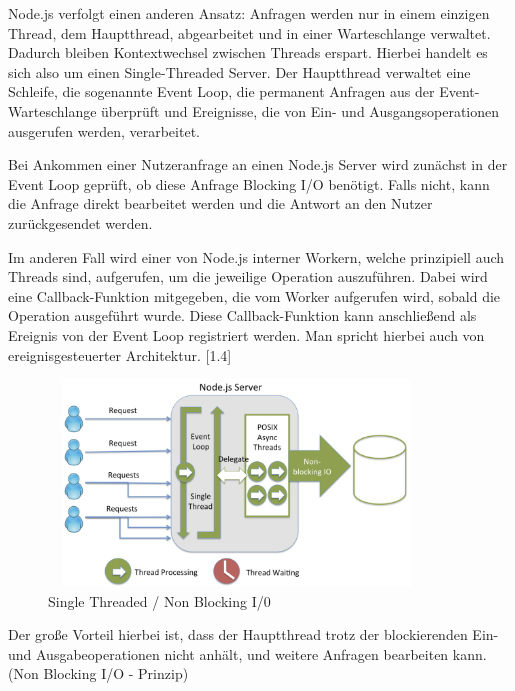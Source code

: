 \newpage

\noindent
Node.js verfolgt einen anderen Ansatz: Anfragen werden nur in einem einzigen Thread, dem Hauptthread, abgearbeitet und in einer Warteschlange verwaltet. Dadurch bleiben Kontextwechsel zwischen Threads erspart. Hierbei handelt es sich also um einen Single-Threaded Server. Der Hauptthread verwaltet eine Schleife, die sogenannte Event Loop, die permanent Anfragen aus der Event-Warteschlange überprüft und Ereignisse, die von Ein- und Ausgangsoperationen ausgerufen werden, verarbeitet.
\newline

\noindent
Bei Ankommen einer Nutzeranfrage an einen Node.js Server wird zunächst in der Event Loop geprüft, ob diese Anfrage Blocking I/O benötigt. Falls nicht, kann die Anfrage direkt bearbeitet werden und die Antwort an den Nutzer zurückgesendet werden. 
\newline

\noindent
Im anderen Fall wird einer von Node.js interner Workern, welche prinzipiell auch Threads sind, aufgerufen, um die jeweilige Operation auszuführen. Dabei wird eine Callback-Funktion mitgegeben, die vom Worker aufgerufen wird, sobald die Operation ausgeführt wurde. Diese Callback-Funktion kann anschließend als Ereignis von der Event Loop registriert werden. Man spricht hierbei auch von ereignisgesteuerter Architektur. [1.4]
\newline
 
\begin{figure}[h]
\centering
\includegraphics[width=10cm, height = 5.5cm]{images/nodejs_nodethreading.png}
\caption{Single Threaded / Non Blocking I/0 \cite{Node1.1}}
\end{figure}
 

\noindent
Der große Vorteil hierbei ist, dass der Hauptthread trotz der blockierenden Ein- und Aus\-gabeoperationen nicht anhält, und weitere Anfragen bearbeiten kann. (Non Blocking I/O - Prinzip) 
\newline

